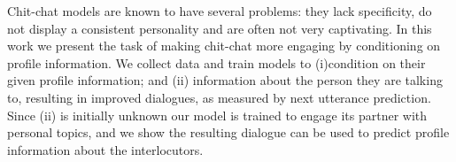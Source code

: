 Chit-chat models are known to have several problems: they lack specificity, do not display a consistent personality and are often not very captivating. In this work we present the task of  making chit-chat more engaging by conditioning on profile information. We collect data and train models to (i)condition on their given profile information; and (ii) information about the person they are talking to, resulting in improved dialogues, as measured by next utterance prediction. Since (ii) is initially unknown our model is trained to engage its partner with personal topics, and we show the resulting dialogue can be used to predict profile information about the interlocutors.

